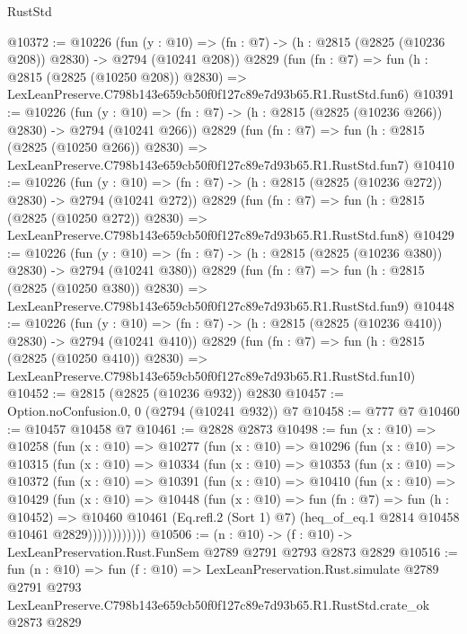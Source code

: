 \begin{lexlean}{RustStd}
\begin{coremodule}
@10372 := @10226
    (fun (y : @10) => (fn : @7) -> (h : @2815 (@2825 (@10236 @208)) @2830) -> @2794 (@10241 @208))
    @2829
    (fun (fn : @7) =>
    fun (h : @2815 (@2825 (@10250 @208)) @2830) =>
    LexLeanPreserve.C798b143e659cb50f0f127c89e7d93b65.R1.RustStd.fun6)
@10391 := @10226
    (fun (y : @10) => (fn : @7) -> (h : @2815 (@2825 (@10236 @266)) @2830) -> @2794 (@10241 @266))
    @2829
    (fun (fn : @7) =>
    fun (h : @2815 (@2825 (@10250 @266)) @2830) =>
    LexLeanPreserve.C798b143e659cb50f0f127c89e7d93b65.R1.RustStd.fun7)
@10410 := @10226
    (fun (y : @10) => (fn : @7) -> (h : @2815 (@2825 (@10236 @272)) @2830) -> @2794 (@10241 @272))
    @2829
    (fun (fn : @7) =>
    fun (h : @2815 (@2825 (@10250 @272)) @2830) =>
    LexLeanPreserve.C798b143e659cb50f0f127c89e7d93b65.R1.RustStd.fun8)
@10429 := @10226
    (fun (y : @10) => (fn : @7) -> (h : @2815 (@2825 (@10236 @380)) @2830) -> @2794 (@10241 @380))
    @2829
    (fun (fn : @7) =>
    fun (h : @2815 (@2825 (@10250 @380)) @2830) =>
    LexLeanPreserve.C798b143e659cb50f0f127c89e7d93b65.R1.RustStd.fun9)
@10448 := @10226
    (fun (y : @10) => (fn : @7) -> (h : @2815 (@2825 (@10236 @410)) @2830) -> @2794 (@10241 @410))
    @2829
    (fun (fn : @7) =>
    fun (h : @2815 (@2825 (@10250 @410)) @2830) =>
    LexLeanPreserve.C798b143e659cb50f0f127c89e7d93b65.R1.RustStd.fun10)
@10452 := @2815 (@2825 (@10236 @932)) @2830
@10457 := Option.noConfusion.{0, 0} (@2794 (@10241 @932)) @7
@10458 := @777 @7
@10460 := @10457 @10458 @7
@10461 := @2828 @2873
@10498 := fun (x : @10) =>
  @10258
    (fun (x : @10) =>
    @10277
      (fun (x : @10) =>
      @10296
        (fun (x : @10) =>
        @10315
          (fun (x : @10) =>
          @10334
            (fun (x : @10) =>
            @10353
              (fun (x : @10) =>
              @10372
                (fun (x : @10) =>
                @10391
                  (fun (x : @10) =>
                  @10410
                    (fun (x : @10) =>
                    @10429
                      (fun (x : @10) =>
                      @10448
                        (fun (x : @10) =>
                        fun (fn : @7) =>
                        fun (h : @10452) =>
                        @10460
                          @10461
                          (Eq.refl.{2} (Sort 1) @7)
                          (heq_of_eq.{1} @2814 @10458 @10461 @2829))))))))))))
@10506 := (n : @10) -> (f : @10) -> LexLeanPreservation.Rust.FunSem @2789 @2791 @2793 @2873 @2829
@10516 := fun (n : @10) =>
  fun (f : @10) =>
  LexLeanPreservation.Rust.simulate
    @2789
    @2791
    @2793
    LexLeanPreserve.C798b143e659cb50f0f127c89e7d93b65.R1.RustStd.crate_ok
    @2873
    @2829
\end{coremodule}
\end{lexlean}
